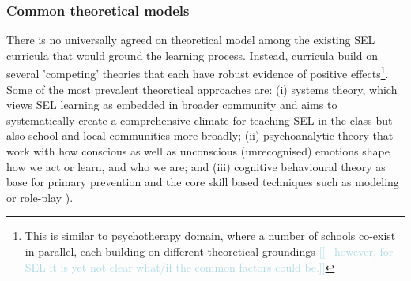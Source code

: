 \documentclass[prodmode,acmtochi]{acmsmall}
\newcommand{\todo}[1]{\textrm{\textrm{\textcolor{LightBlue}{[[#1]]} } } }
\newcommand{\qq}[2]{\textrm{\textit{``#2''}}{ [#1]}}
\begin{document}



\subsubsection{Common theoretical models}
There is no universally agreed on theoretical model among the existing SEL curricula \cite{Payton2000} that would ground the learning process. Instead, curricula build on several 'competing' theories that each have robust evidence of positive effects\footnote{This is similar to psychotherapy domain, where a number of schools co-exist in parallel, each building on different theoretical groundings \todo{-- however, for SEL it is yet not clear what/if the common factors could be.}}. 
Some of the most prevalent theoretical approaches are: (i) systems theory, which views SEL learning as embedded in broader community and aims to systematically create a comprehensive climate for teaching SEL in the class but also school and local communities more broadly; (ii) psychoanalytic theory that work with how conscious as well as unconscious (unrecognised) emotions shape how we act or learn, and who we are; and (iii) cognitive behavioural theory as base for primary prevention and the core skill based techniques such as modeling or role-play \cite[p.65]{Maree2007}).
\end{document}
